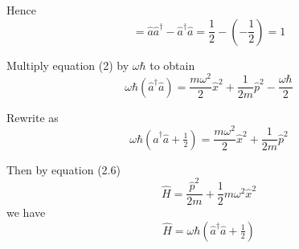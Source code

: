 \documentclass[12pt]{article}
\begin{document}
Hence
\begin{equation*}
[\hat a,\hat a^\dag]=\hat a\hat a^\dag-\hat a^\dag\hat a=\frac{1}{2}-\left(-\frac{1}{2}\right)=1
\end{equation*}

Multiply equation (2) by $\omega\hbar$ to obtain
\begin{equation*}
\omega\hbar\left(\hat a^\dag\hat a\right)=\frac{m\omega^2}{2}\hat x^2+\frac{1}{2m}\hat p^2-\frac{\omega\hbar}{2}
\end{equation*}

Rewrite as
\begin{equation*}
\omega\hbar\left(\hat a^\dag\hat a+\tfrac{1}{2}\right)
=\frac{m\omega^2}{2}\hat x^2+\frac{1}{2m}\hat p^2
\end{equation*}

Then by equation (2.6)
\begin{equation*}
\hat H=\frac{\hat p^2}{2m}+\frac{1}{2}m\omega^2\hat x^2
\tag{2.6}
\end{equation*}
we have
\begin{equation*}
\hat H=\omega\hbar\left(\hat a^\dag\hat a+\tfrac{1}{2}\right)
\end{equation*}
\end{document}
